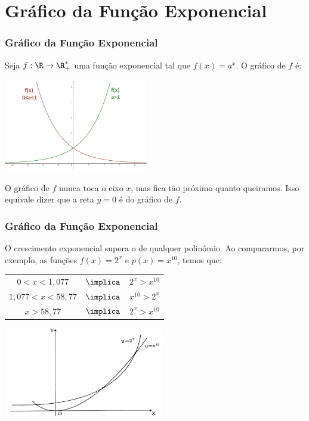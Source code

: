 \section{Gráfico da Função Exponencial}
\begin{frame}
\frametitle{Gráfico da Função Exponencial} 

\begin{exemplo}
Seja $f: \R \to \R_+^\ast$ uma função exponencial tal que $f(x) =
a^x$. O gráfico de $f$ é:
\begin{center}
\includegraphics[width=6.3cm]{figures/grafexp.jpg}
\end{center}
O gráfico de $f$ nunca toca o eixo $x$, mas fica tão próximo quanto
queiramos. Isso equivale dizer que a reta $y=0$ é  do
gráfico de $f$.
\end{exemplo}

\end{frame}




\begin{frame}
\frametitle{Gráfico da Função Exponencial} 

\begin{exemplo}
O crescimento exponencial supera o de qualquer polinômio. Ao
compararmos, por exemplo, as funções $f(x) = 2^x$ e
$p(x)=x^{10}$, temos que:\\
\begin{tabular}{ccc}
$0<x<1{,}077$ & $\implica$ & $2^x > x^{10}$\\
$1{,}077 < x < 58{,}77$ & $\implica$ & $x^{10} > 2^x$\\
$x>58{,}77$ & $\implica $& $2^x > x^{10}$
\end{tabular}
\begin{center}
\includegraphics[width=7cm]{figures/polXexp.jpg}
\end{center}
\end{exemplo}

\end{frame}
